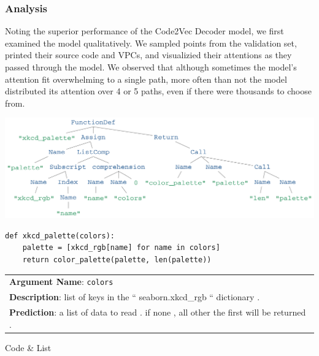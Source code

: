 \subsubsection{Analysis} %
\label{ssub:analysis}
Noting the superior performance of the Code2Vec Decoder model, we first examined the model qualitatively. We sampled points from the validation set, printed their source code and VPCs, and visualizied their attentions as they passed through the model.
We observed that although sometimes the model's attention fit overwhelming to a single path, more often than not the model distributed its attention over 4 or 5 paths, even if there were thousands to choose from.

\begin{listing}[h!] 
\begin{center}

\includegraphics[width=\linewidth]{ImagesCodeRelated/xkcd_palette_strip.png}
\begin{verbatim}
def xkcd_palette(colors):
    palette = [xkcd_rgb[name] for name in colors]
    return color_palette(palette, len(palette))

\end{verbatim}
\begin{tabular}{l}
\textbf{Argument Name}: \texttt{colors}\\
\textbf{Description}: list of keys in the `` seaborn.xkcd\_rgb `` dictionary .\\
\textbf{Prediction}: a list of data to read . if none , all other the first will be returned .\\
\end{tabular}
\end{center}
\caption{Code \& List}
\label{fig:single_examples_code}
\end{listing}


